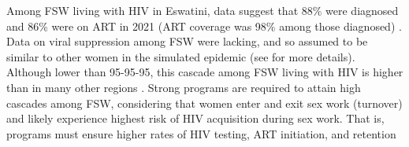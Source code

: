 \par
Among FSW living with HIV in Eswatini, data suggest that
88\% were diagnosed and 86\% were on ART in 2021
(\ie ART coverage was 98\% among those diagnosed) \cite{EswIBBS2022}.
Data on viral suppression among FSW were lacking,
and so assumed to be similar to other women in the simulated epidemic
(see  for more details).
Although lower than 95-95-95, this cascade among FSW living with HIV
is higher than in many other regions \cite{Schwartz2017,Hakim2018}.
Strong programs are required to attain high cascades among FSW,
considering that women enter and exit sex work (turnover) and
likely experience highest risk of HIV acquisition during sex work.
That is, programs must ensure higher rates of HIV testing, ART initiation, and retention
